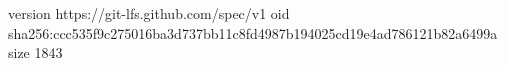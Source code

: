 version https://git-lfs.github.com/spec/v1
oid sha256:ccc535f9c275016ba3d737bb11c8fd4987b194025cd19e4ad786121b82a6499a
size 1843
